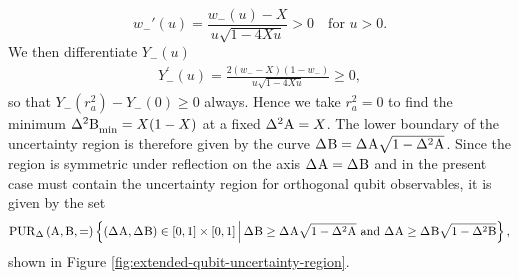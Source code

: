 \begin{equation}\label{eq:w_->X}
w_-'(u)=\frac{w_-(u)-X}{u\sqrt{1-4Xu}}>0\quad\text{for }u>0.
\end{equation}
We then differentiate $Y_-(u)$
\begin{align}
  Y_-^\prime(u) = \frac{2(w_--X)(1-w_-)}{u\sqrt{1-4Xu}}\ge 0,
\end{align}
so that $Y_-(r_a^2) - Y_-(0)\ge 0$ always.
Hence we  take $r_a^2 = 0$ to find the minimum $\varmin{\opb}=X(1-X)$ at a fixed $\var{\opa}=X$. The lower boundary of the uncertainty region is therefore given by the curve $\sdev{\opb} = \sdev{\opa}\sqrt{1-\var{\opa}}$. Since the region is symmetric under reflection on the axis $\sdev\opa=\sdev\opb$ and in the present case must contain the uncertainty region for orthogonal qubit observables, it is given by the set
\begin{align}
  \PUR{\Delta}{\opa,\opb} = \left\{(\sdev{\opa},\sdev{\opb})\in [0,1]\times[0,1]\, \middle|\, \sdev{\opb} \geq \sdev{\opa}\sqrt{1-\var{\opa}} \text{ and } \sdev{\opa} \geq \sdev{\opb}\sqrt{1-\var{\opb}}  \right\},%
\end{align}
shown in Figure \ref{fig:extended-qubit-uncertainty-region}.

